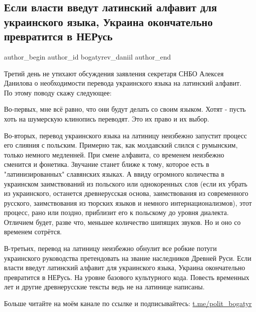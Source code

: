  
 
 
 
 
 
\subsection{Если власти введут латинский алфавит для украинского языка, Украина окончательно превратится в НЕРусь}
\label{sec:13_09_2021.fb.bogatyrev_daniil.1.latinica_nerusj}
 
\ifcmt
 author_begin
   author_id bogatyrev_daniil
 author_end
\fi

Третий день не утихают обсуждения заявления секретаря СНБО Алексея Данилова о
необходимости перевода украинского языка на латинский алфавит. По этому поводу
скажу следующее:

Во-первых, мне всё равно, что они будут делать со своим языком. Хотят - пусть
хоть на шумерскую клинопись переводят. Это их право и их выбор.

Во-вторых, перевод украинского языка на латиницу неизбежно запустит процесс его
слияния с польским. Примерно так, как молдавский слился с румынским, только
немного медленней. При смене алфавита, со временем неизбежно сменится и
фонетика. Звучание станет ближе к тому, которое есть в "латинизированных"
славянских языках. А ввиду огромного количества в украинском заимствований из
польского или однокоренных слов (если их убрать из украинского, останется
древнерусская основа, заимствования из современного русского, заимствования из
тюрских языков и немного интернационализмов), этот процесс, рано или поздно,
приблизит его к польскому до уровня диалекта. Отличием будет, разве что,
меньшее количество шипящих звуков. Но и оно со временем сотрётся.

В-третьих, перевод на латиницу неизбежно обнулит все робкие потуги украинского
руководства претендовать на звание наследников Древней Руси. Если власти введут
латинский алфавит для украинского языка, Украина окончательно превратится в
НЕРусь. На уровне базового культурного кода. Повесть временных лет и другие
древнерусские тексты ведь не на латинице написаны.

Больше читайте на моём канале по ссылке и подписывайтесь:
\url{t.me/polit_bogatyr}
